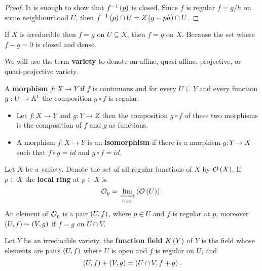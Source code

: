 \begin{proof}
It is enough to show that $ f^{-1}\left( p \right) $ is closed. Since $ f $ is regular $ f = g / h $ on some neighbourhood $ U $, then $ f^{-1}\left( p \right) \cap U = Z\left( g - ph \right) \cap U $.
\end{proof}

\begin{remark}
If $ X $ is irreducible then $ f = g $ on $ U \subseteq X $, then $ f = g $ on $ X $. Because the set where $ f - g = 0 $ is closed and dense.
\end{remark}

\begin{definition}
We will use the term \textbf{variety} to denote an affine, quasi-affine, projective, or quasi-projective variety.
\end{definition}

\begin{definition}
A \textbf{morphism} $ f : X \to Y $ if $ f $ is continuous and for every $ U \subseteq Y $ and every function $ g : U \to \mathbb{A}^1 $ the composition $ g \circ f $ is regular.
\end{definition}

\begin{remark}
\hfill
\begin{itemize}
\item Let $ f : X \to Y $ and $ g : Y \to Z $ then the composition $ g \circ f $ of these two morphisms is the composition of $ f $ and $ g $ as functions.
\item A morphism $ f : X \to Y $ is an \textbf{isomorphism} if there is a morphism $ g : Y \to X $ such that $ f \circ g = id $ and $ g \circ f = id $.
\end{itemize}
\end{remark}

\begin{definition}
Let $ X $ be a variety. Denote the set of all regular functions of $ X $ by $ \mathcal{O}\left( X \right) $. If $ p \in X $ the \textbf{local ring} at $ p \in X $ is
$$ \mathcal{O}_p = \lim_{\xrightarrow[U \ni p]{}}\left( \mathcal{O}\left( U \right) \right). $$
An element of $ \mathcal{O}_p $ is a pair $ \left( U, f \right) $, where $ p \in U $ and $ f $ is regular at $ p $, moreover $ \left( U, f \right) \sim \left( V, g \right) $ if $ f = g $ on $ U \cap V $.
\end{definition}


\begin{definition}
Let $ Y $ be an irreducible variety, the \textbf{function field} $ K\left( Y \right) $ of $ Y $ is the field whose elements are pairs $ \left( U, f \right) $ where $ U $ is open and $ f $ is regular on $ U $, and
$$ \left( U, f \right) + \left( V, g \right) = \left( U \cap V, f + g \right). $$
\end{definition}

